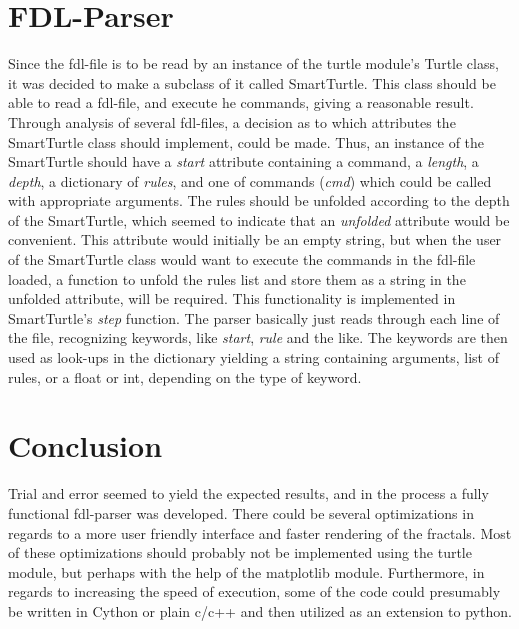 \documentclass[titlepage]{article}
\begin{document}
\section{FDL-Parser}
Since the fdl-file is to be read by an instance of the turtle module's Turtle class, it was decided to make a subclass of it called SmartTurtle. This class should be able to read a fdl-file, and execute he commands, giving a reasonable result. Through analysis of several fdl-files, a decision as to which attributes the SmartTurtle class should implement, could be made. Thus, an instance of the SmartTurtle should have a \textit{start} attribute containing a command, a \textit{length}, a \textit{depth}, a dictionary of \textit{rules}, and one of commands (\textit{cmd}) which could be called with appropriate arguments. The rules should be unfolded according to the depth of the SmartTurtle, which seemed to indicate that an \textit{unfolded} attribute would be convenient. This attribute would initially be an empty string, but when the user of the SmartTurtle class would want to execute the commands in the fdl-file loaded, a function to unfold the rules list and store them as a string in the unfolded attribute, will be required. This functionality is implemented in SmartTurtle's \textit{step} function. The parser basically just reads through each line of the file, recognizing keywords, like \textit{start}, \textit{rule} and the like. The keywords are then used as look-ups in the dictionary yielding a string containing arguments, list of rules, or a float or int, depending on the type of keyword. 

\section{Conclusion}
Trial and error seemed to yield the expected results, and in the process a fully functional fdl-parser was developed. There could be several optimizations in regards to a more user friendly interface and faster rendering of the fractals. Most of these optimizations should probably not be implemented using the turtle module, but perhaps with the help of the matplotlib module. Furthermore, in regards to increasing the speed of execution, some of the code could presumably be written in Cython or plain c/c++ and then utilized as an extension to python.

\appendix
\end{document}
